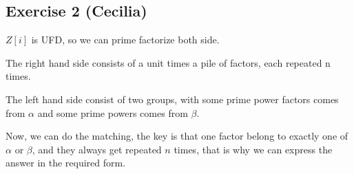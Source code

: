 \subsection*{Exercise 2 (Cecilia)}
$ Z[i] $ is UFD, so we can prime factorize both side.

The right hand side consists of a unit times a pile of factors, each repeated n times.

The left hand side consist of two groups, with some prime power factors comes from $ \alpha $ and some prime powers comes from $ \beta $.

Now, we can do the matching, the key is that one factor belong to exactly one of $ \alpha $ or $ \beta $, and they always get repeated $ n $ times, that is why we can express the answer in the required form.